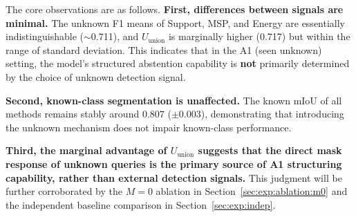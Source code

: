 \documentclass[3p,twocolumn,authoryear]{elsarticle}
\begin{document}
\begin{table}[t]
\centering
\caption{Comparison of different unknown decision signals under the Synapse A1 protocol.
All methods share the same trained model ($M=2$), with only the unknown decision signal
replaced. Mean$\pm$std across three seeds are reported.}\label{tab:a1_main}
\footnotesize
\setlength{\tabcolsep}{3pt}
\end{table}

The core observations are as follows.
\textbf{First, differences between signals are minimal.}
The unknown F1 means of Support, MSP, and Energy are essentially indistinguishable
($\sim$0.711), and $U_{\text{union}}$ is marginally higher (0.717) but within the
range of standard deviation.
This indicates that in the A1 (seen unknown) setting, the model's structured abstention
capability is \textbf{not} primarily determined by the choice of unknown detection signal.

\textbf{Second, known-class segmentation is unaffected.}
The known mIoU of all methods remains stably around $0.807$ ($\pm 0.003$),
demonstrating that introducing the unknown mechanism does not impair known-class performance.

\textbf{Third, the marginal advantage of $U_{\text{union}}$ suggests that
the direct mask response of unknown queries is the primary source of A1 structuring
capability, rather than external detection signals.}
This judgment will be further corroborated by the $M=0$ ablation in
Section~\ref{sec:exp:ablation:m0} and the independent baseline comparison in
Section~\ref{sec:exp:indep}.
\end{document}
